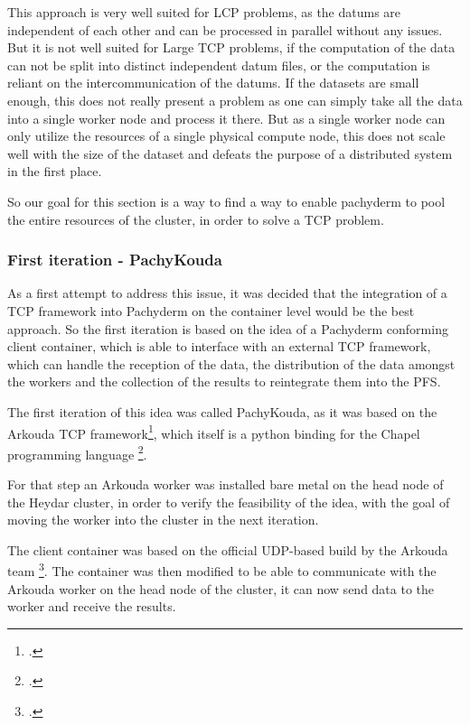 This approach is very well suited for \ac{LCP} problems, as the datums are independent of each other and can be processed in parallel without any issues.
But it is not well suited for Large \ac{TCP} problems, if the computation of the data can not be split into distinct independent datum files, or the computation is reliant on the intercommunication of the datums.
If the datasets are small enough, this does not really present a problem as one can simply take all the data into a single worker node and process it there.
But as a single worker node can only utilize the resources of a single physical compute node, this does not scale well with the size of the dataset and defeats the purpose of a distributed system in the first place.

So our goal for this section is a way to find a way to enable pachyderm to pool the entire resources of the cluster, in order to solve a \ac{TCP} problem.

\subsubsection{First iteration - PachyKouda}

As a first attempt to address this issue, it was decided that the integration of a \ac{TCP} framework into Pachyderm on the container level would be the best approach.
So the first iteration is based on the idea of a Pachyderm conforming client container, which is able to interface with an external \ac{TCP} framework,
which can handle the reception of the data, the distribution of the data amongst the workers and the collection of the results to reintegrate them into the \ac{PFS}.

The first iteration of this idea was called PachyKouda, as it was based on the Arkouda \ac{TCP} framework\footcite{ArkoudaGituhbRepository2023},
which itself is a python binding for the Chapel programming language \footcite{ChapellangChapelProductive}. 

For that step an Arkouda worker was installed bare metal on the head node of the Heydar cluster, in order to verify the feasibility of the idea,
with the goal of moving the worker into the cluster in the next iteration.

The client container was based on the official \ac{UDP}-based build by the Arkouda team \footcite{ArkoudacontribArkoudadockerMain}.
The container was then modified to be able to communicate with the Arkouda worker on the head node of the cluster, it can now send data to the worker and receive the results.

